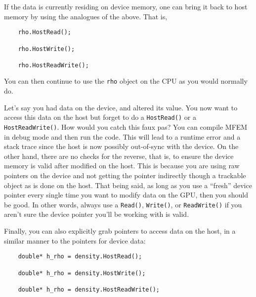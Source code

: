 \documentclass[a4paper,11pt]{article}
\begin{document}
If the data is currently residing on device memory, one can bring it back to host memory by using the analogues of the above. That is,
\begin{lstlisting}
    rho.HostRead();

    rho.HostWrite();

    rho.HostReadWrite();
\end{lstlisting}
You can then continue to use the \texttt{rho} object on the CPU as you would normally do.

Let's say you had data on the device, and altered its value. You now want to access this data on the host but forget to do a \texttt{HostRead()} or a \texttt{HostReadWrite()}. How would you catch this faux pas? You can compile MFEM in debug mode and then run the code. This will lead to a runtime error and a stack trace since the host is now possibly out-of-sync with the device. On the other hand, there are no checks for the reverse, that is, to ensure the device memory is valid after modified on the host. This is because you are using raw pointers on the device and not getting the pointer indirectly though a trackable object as is done on the host. That being said, as long as you use a ``fresh'' device pointer every single time you want to modify data on the GPU, then you should be good. In other words, always use a \texttt{Read()}, \texttt{Write()}, or \texttt{ReadWrite()} if you aren't sure the device pointer you'll be working with is valid.

Finally, you can also explicitly grab pointers to access data on the host, in a similar manner to the pointers for device data:
\begin{lstlisting}
    double* h_rho = density.HostRead();

    double* h_rho = density.HostWrite();

    double* h_rho = density.HostReadWrite();
\end{lstlisting}

\end{document}
